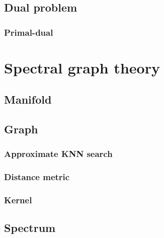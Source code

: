 \documentclass[a4paper,12pt,twoside]{report}
\begin{document}
\section{Dual problem}

\subsection{Primal-dual}

\chapter{Spectral graph theory}

\section{Manifold}

\section{Graph}

\subsection{Approximate KNN search}

\subsection{Distance metric}

\subsection{Kernel}

\section{Spectrum}
\end{document}
